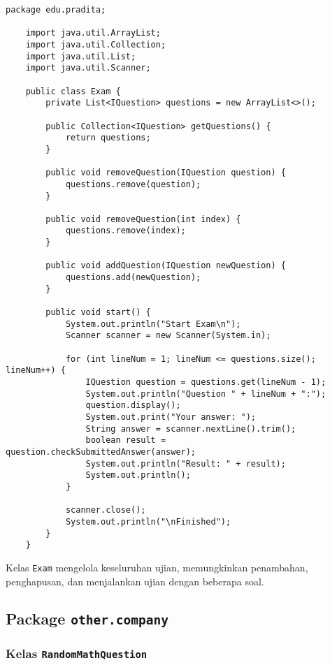\begin{lstlisting}[style=JavaStyle]
	package edu.pradita;
	
	import java.util.ArrayList;
	import java.util.Collection;
	import java.util.List;
	import java.util.Scanner;
	
	public class Exam {
		private List<IQuestion> questions = new ArrayList<>();
		
		public Collection<IQuestion> getQuestions() {
			return questions;
		}
		
		public void removeQuestion(IQuestion question) {
			questions.remove(question);
		}
		
		public void removeQuestion(int index) {
			questions.remove(index);
		}
		
		public void addQuestion(IQuestion newQuestion) {
			questions.add(newQuestion);
		}
		
		public void start() {
			System.out.println("Start Exam\n");
			Scanner scanner = new Scanner(System.in);
			
			for (int lineNum = 1; lineNum <= questions.size(); lineNum++) {
				IQuestion question = questions.get(lineNum - 1);
				System.out.println("Question " + lineNum + ":");
				question.display();
				System.out.print("Your answer: ");
				String answer = scanner.nextLine().trim();
				boolean result = question.checkSubmittedAnswer(answer);
				System.out.println("Result: " + result);
				System.out.println();
			}
			
			scanner.close();
			System.out.println("\nFinished");
		}
	}
\end{lstlisting}

Kelas \texttt{Exam} mengelola keseluruhan ujian, memungkinkan penambahan, penghapusan, dan menjalankan ujian dengan beberapa soal.

\subsection{Package \texttt{other.company}}

\subsubsection{Kelas \texttt{RandomMathQuestion}}

